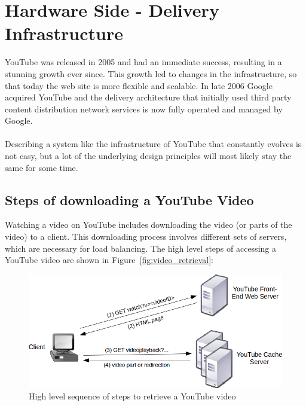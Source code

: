 \section{Hardware Side - Delivery Infrastructure}
\label{chp:hardware_side}

YouTube was released in 2005 and had an immediate success, resulting in a stunning growth ever since. This growth led to changes in the infrastructure, so that today the web site is more flexible and scalable. In late 2006 Google acquired YouTube and the delivery architecture that initially used third party content distribution network services is now fully operated and managed by Google.
\\
\\
Describing a system like the infrastructure of YouTube that constantly evolves is not easy, but a lot of the underlying design principles will most likely stay the same for some time.

\subsection{Steps of downloading a YouTube Video}

Watching a video on YouTube includes downloading the video (or parts of the video) to a client. This downloading process involves different sets of servers, which are necessary for load balancing. The high level steps of accessing a YouTube video are shown in Figure~\vref{fig:video_retrieval}:

\begin{figure}[htbp]
  \begin{center}
    \includegraphics[width=\textwidth]{pictures/video_retrieval.png}
    \caption{High level sequence of steps to retrieve a YouTube video}
    \label{fig:video_retrieval}
  \end{center}
\end{figure}

